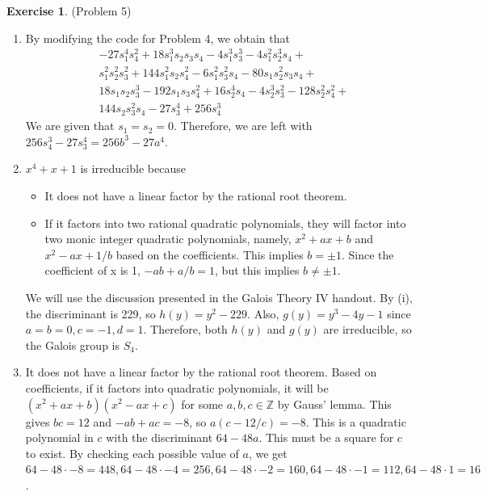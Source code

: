 \documentclass[12pt, psamsfonts]{amsart}
\theoremstyle{definition}
\newtheorem*{exer}{Exercise}
\theoremstyle{remark}
\numberwithin{equation}{section}
\begin{document}
\begin{exer}{(Problem 5)}
  \begin{enumerate}[label=(\roman*)]
    \item 
      By modifying the code for Problem 4, we obtain that
      \begin{align*}
        &-27s_{1}^{4}s_{4}^{2}+18s_{1}^{3}s_{2}s_{3}s_{4}-4s_{1}^{3}s_{3}^{3}-4s_{1}^{2}s_{2}^{3}s_{4}+\\
        &s_{1}^{2}s_{2}^{2}s_{3}^{2}+144s_{1}^{2}s_{2}s_{4}^{2}-6s_{1}^{2}s_{3}^{2}s_{4}-80s_{1}s_{2}^{2}s_{3}s_{4}+\\
        &18s_{1}s_{2}s_{3}^{3}-192s_{1}s_{3}s_{4}^{2}+16s_{2}^{4}s_{4}-4s_{2}^{3}s_{3}^{2}-128s_{2}^{2}s_{4}^{2}+\\
        &144s_{2}s_{3}^{2}s_{4}-27s_{3}^{4}+256s_{4}^{3}
      \end{align*}
      We are given that $s_1 = s_2 = 0$.
      Therefore, we are left with $256s_4^3 - 27s_3^4 = 256b^3 - 27a^4$.
    \item
      $x^4 + x + 1$ is irreducible because
      \begin{itemize}
        \item
          It does not have a linear factor by the rational root theorem.
        \item
          If it factors into two rational quadratic polynomials, they will factor into two monic integer quadratic polynomials, namely, $x^2 + ax + b$ and $x^2 - ax + 1/b$ based on the coefficients.
          This implies $b = \pm 1$.
          Since the coefficient of x is 1, $-ab + a/b = 1$, but this implies $b \ne \pm 1$.
      \end{itemize}
      We will use the discussion presented in the Galois Theory IV handout.
      By (i), the discriminant is 229, so $h(y) = y^2 - 229$.
      Also, $g(y) = y^3 - 4y - 1$ since $a = b = 0, c = -1, d = 1$.
      Therefore, both $h(y)$ and $g(y)$ are irreducible, so the Galois group is $S_4$.
    \item
      It does not have a linear factor by the rational root theorem.
      Based on coefficients, if it factors into quadratic polynomials, it will be $(x^2 + ax + b)(x^2 - ax + c)$ for some $a, b, c \in \mathbb{Z}$ by Gauss' lemma.
      This gives $bc = 12$ and $-ab + ac = -8$, so $a(c - 12/c) = -8$.
      This is a quadratic polynomial in $c$ with the discriminant $64 - 48a$.
      This must be a square for $c$ to exist.
      By checking each possible value of $a$, we get $64 - 48 \cdot -8 = 448, 64 - 48 \cdot -4 = 256, 64 - 48 \cdot -2 = 160, 64 - 48 \cdot -1 = 112, 64 - 48 \cdot 1 = 16$.

\end{enumerate}
\end{exer}
\end{document}

